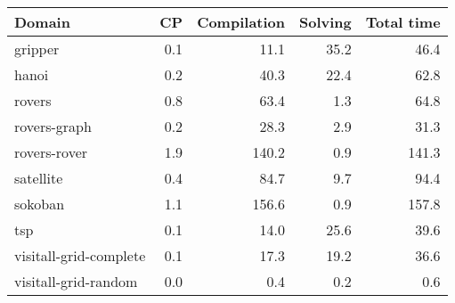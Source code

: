 \begin{tabular}{l|rrr|r}
	\toprule
	Domain & CP & Compilation & Solving & Total time \\ 
	\midrule 
	gripper & 0.1 & 11.1 & 35.2 & 46.4 \\ 
	hanoi & 0.2 & 40.3 & 22.4 & 62.8 \\ 
	rovers & 0.8 & 63.4 & 1.3 & 64.8 \\ 
	rovers-graph & 0.2 & 28.3 & 2.9 & 31.3 \\ 
	rovers-rover & 1.9 & 140.2 & 0.9 & 141.3 \\ 
	satellite & 0.4 & 84.7 & 9.7 & 94.4 \\ 
	sokoban & 1.1 & 156.6 & 0.9 & 157.8 \\ 
	tsp & 0.1 & 14.0 & 25.6 & 39.6 \\ 
	visitall-grid-complete & 0.1 & 17.3 & 19.2 & 36.6 \\ 
	visitall-grid-random & 0.0 & 0.4 & 0.2 & 0.6 \\ 
	\bottomrule
\end{tabular}